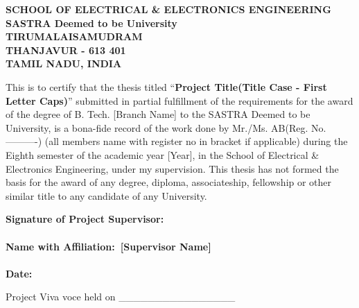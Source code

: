 \documentclass[a4paper, 12pt, oneside]{sastra_eee}
\begin{document}
	\begin{center}
		\Large{\textbf{SCHOOL OF ELECTRICAL \& ELECTRONICS ENGINEERING}}\\
        \large{\textbf{SASTRA Deemed to be University}}\\
        \normalsize{\textbf{TIRUMALAISAMUDRAM}}\\
		\normalsize{\textbf{THANJAVUR - 613 401}}\\
        \normalsize{\textbf{TAMIL NADU, INDIA}}
	\end{center}
	
	
	
	\certificate
	
	\vspace*{0.1in}

	\begin{singlespace}
		
		This is to certify that the thesis titled ``\textbf{Project Title(Title Case - First Letter Caps)}'' submitted in partial fulfillment of the requirements for the award of the degree of B. Tech. [Branch Name] to the SASTRA Deemed to be University, is a bona-fide record of the work done by Mr./Ms. AB(Reg. No. ----------) (all members name with register no in bracket if applicable) during the Eighth semester of the academic year [Year], in the School of Electrical \& Electronics Engineering, under my supervision. This thesis has not formed the basis for the award of any degree, diploma, associateship, fellowship or other similar title to any candidate of any University.
		
	\end{singlespace}
	\vspace*{0.1in}
	
\noindent\textbf{Signature of Project Supervisor:}~	\\
\\
\textbf{Name with Affiliation\hspace*{19mm}:~\textbf{[Supervisor Name]}}	\\
\\
\textbf{Date\hspace*{48.25mm}:}\\
	
	\vspace*{0.1in}
	
	\noindent Project Viva voce held on \_\_\_\_\_\_\_\_\_\_\_\_\_\_\_\_ 
	
\end{document}
